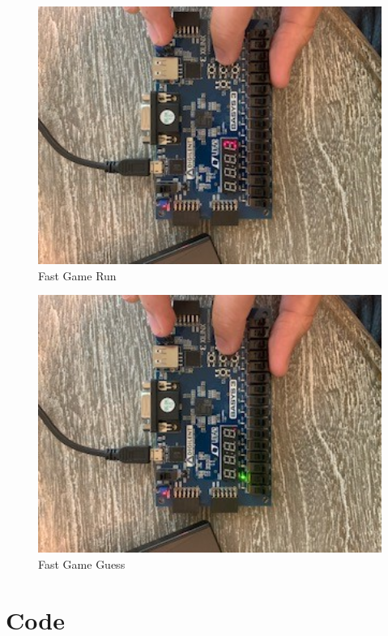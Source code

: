 \documentclass[11pt]{article}
\begin{document}
\begin{figure}[ht]\centering
	\includegraphics[width=1\textwidth,trim =0 0 0 0,clip, angle=90,origin=c]{fastGamerun}
	\caption{Fast Game Run}
	\label{fig:sim_with_table}
\end{figure}

\begin{figure}[ht]\centering
	\includegraphics[width=1\textwidth,trim =0 0 0 0,clip,angle=90,origin=c]{fastgameGuess}
	\caption{Fast Game Guess}
	\label{fig:sim_with_table}
\end{figure}

\clearpage
\section*{Code}
\end{document}
